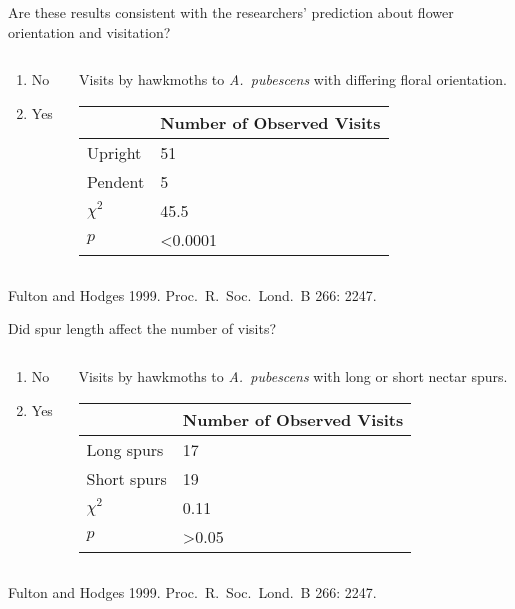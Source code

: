 \documentclass[t,hidelinks]{beamer}
\newcommand{\ques}[1]{\highlight{\textsc{q#1:}}}
\begin{document}
%
\begin{frame}[t]{\ques{11} Are these results consistent with the researchers’ prediction about flower orientation and visitation?}
	
	\begin{columns}[t]
		\begin{column}{0.28\textwidth}
			\begin{enumerate}
				\item No
				\item \alert<2>{Yes}
			\end{enumerate}
		\end{column}
		\begin{column}{0.5\textwidth}
	Visits by hawkmoths to \textit{A.~pubescens} with differing floral orientation.
	
			\begin{tabular}{L{0.6in}R{1in}}
				\toprule
				& Number of Observed Visits \tabularnewline
				\midrule
				Upright		&	51	 \tabularnewline
				Pendent		&	5	 \tabularnewline
				$\chi^2$	&	45.5 \tabularnewline
				$p$			&  \textless0.0001 \tabularnewline
				\bottomrule
			\end{tabular}
		\end{column}
	\end{columns}

	\vfilll
	
	\hfill \tiny Fulton and Hodges 1999. Proc.~R.~Soc.~Lond.~B 266: 2247.

\end{frame}
%
\begin{frame}[t]{\ques{12} Did spur length affect the number of visits?}
	
	\begin{columns}[t]
		\begin{column}{0.28\textwidth}
			\begin{enumerate}
				\item \alert<2>{No}
				\item Yes
			\end{enumerate}
		\end{column}
		\begin{column}{0.5\textwidth}
			Visits by hawkmoths to \textit{A.~pubescens} with long or short nectar spurs.
			
			\begin{tabular}{L{0.75in}R{1in}}
				\toprule
				& Number of Observed Visits \tabularnewline
				\midrule
				Long spurs		&	17	 \tabularnewline
				Short spurs		&	19	 \tabularnewline
				$\chi^2$		&	0.11 \tabularnewline
				$p$				&  \textgreater0.05 \tabularnewline
				\bottomrule
			\end{tabular}
		\end{column}
	\end{columns}

	\vfilll
	
	\hfill \tiny Fulton and Hodges 1999. Proc.~R.~Soc.~Lond.~B 266: 2247.

\end{frame}
\end{document}
